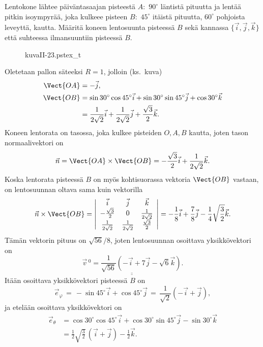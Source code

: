 \begin{Exa}
Lentokone lähtee päiväntasaajan pisteestä $A:$ $90^\circ$ läntistä pituutta ja lentää pitkin 
isoympyrää, joka kulkeee pisteen  $B:$ $45^\circ$ itäistä pituutta, $60^\circ$ pohjoista 
leveyttä, kautta. Määritä koneen lentosuunta pisteessä $B$ sekä kannassa 
$\{\vec i, \vec j, \vec k\}$ että suhteessa ilmansuuntiin pisteessä $B$.
\end{Exa}
\begin{figure}[H]
\begin{center}
{kuvaII-23.pstex_t}
\end{center}
\end{figure}
\ratk Oletetaan pallon säteeksi $R=1$, jolloin (ks.\ kuva)
\begin{align*}
\Vect{OA} &= - \vec j, \\
\Vect{OB} &= \sin{30^\circ}\cos{45^\circ} \vec i 
+ \sin{30^\circ}\sin{45^\circ} \vec j + \cos{30^\circ} \vec k \\
&= \frac{1}{2\sqrt{2}} \vec i + \frac{1}{2\sqrt{2}} \vec j +
\frac{\sqrt{3}}{2} \vec k.
\end{align*}
Koneen lentorata on tasossa, joka kulkee pisteiden $O, A, B$ kautta, joten tason
normaalivektori on
\[
\vec n = \Vect{OA} \times \Vect{OB} 
       = -\frac{\sqrt{3}}{2}\vec i + \frac{1}{2\sqrt{2}}\vec k.
\]
Koska lentorata pisteessä $B$ on myös kohtisuorassa vektoria $\Vect{OB}$ vastaan, on
lentosuunnan oltava sama kuin vektorilla
\[
\vec n\times\Vect{OB} 
   = \left|\begin{array}{ccc}
     \vec i & \vec j & \vec k \\
     -\tfrac{\sqrt{3}}{2} & 0 & \tfrac{1}{2\sqrt{2}} \\
     \tfrac{1}{2\sqrt{2}} & \tfrac{1}{2\sqrt{2}} & \tfrac{\sqrt{3}}{2}
     \end{array} \right|
   = -\frac{1}{8}\vec i + \frac{7}{8}\vec j - \frac{1}{4}\sqrt{\frac{3}{2}}\vec k.
\]
Tämän vektorin pituus on $\sqrt{56}/8$, joten lentosuunnan osoittava yksikkövektori on
\[
\underline{\underline{\vec v\,^0 = \frac{1}{\sqrt{56}}(-\vec i + 7\vec j -\sqrt{6}\vec k)}}.
\]
Itään osoittava yksikkövektori pisteessä $B$ on
\[
\vec e_\varphi \,=\, - \sin{45^\circ} \vec i + \cos{45^\circ} \vec j 
               \,=\, \frac{1}{\sqrt{2}}(-\vec i + \vec j),
\]
ja etelään osoittava yksikkövektori on
\begin{align*}
\vec e_\theta &= \cos{30^\circ} \cos{45^\circ} \vec i +
\cos{30^\circ} \sin{45^\circ} \vec j - \sin{30^\circ}\vec k \\
&= \frac{1}{2}\sqrt{\frac{3}{2}}\,(\vec i + \vec j) - \frac{1}{2} \vec k.
\end{align*}
